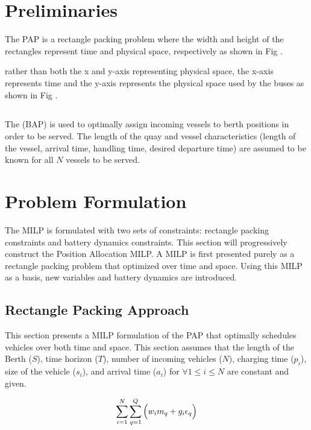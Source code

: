 \documentclass[letterpaper, 10pt, conference]{IEEEtran}
\begin{document}
\section{Preliminaries}
\label{sec:preliminaries}
The PAP is a rectangle packing problem where the width and height of the rectangles represent time and physical space, respectively as shown in Fig \cite{fig:}. 


rather than both the x and y-axis representing physical space, the x-axis represents time and the y-axis represents the physical space used by the buses as shown in Fig \cite{fig:}.

\subsection{}
The (BAP) is used to optimally assign incoming vessels to berth positions in order to be served. The length of the quay and vessel characteristics (length of the vessel, arrival time, handling time, desired departure time) are assumed to be known for all $N$ vessels to be served.

%
\section{Problem Formulation}
\label{sec:problemformulation}
The MILP is formulated with two sets of constraints: rectangle packing constraints and battery dynamics constraints. This section will progressively construct the Position Allocation MILP. A MILP is first presented purely as a rectangle packing problem that optimized over time and space. Using this MILP as a basis, new variables and battery dynamics are introduced.

\subsection{Rectangle Packing Approach}
This section presents a MILP formulation of the PAP that optimally schedules vehicles over both time and space. This section assumes that the length of the Berth ($S$), time horizon ($T$), number of incoming vehicles ($N$), charging time ($p_i$), size of the vehicle ($s_i$), and arrival time ($a_i$) for $\forall 1 \leq i \leq N$ are constant and given.

\begin{equation}\label{eq:objective}
    \sum_{i=1}^N \sum_{q=1}^Q \Big( w_i m_q + g_i \epsilon_q \Big) \\
\end{equation}
\end{document}
